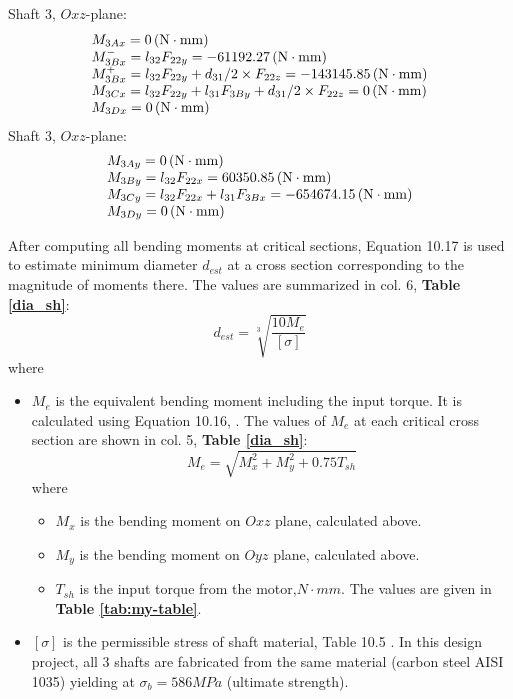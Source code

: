 Shaft 3, $ Oxz $-plane:
\[
\begin{array}{l}
M_{3Ax} = 0 \, (\mathrm{N\cdot mm})\\
M_{3Bx}^- = l_{32}F_{22y} = -61192.27 \, (\mathrm{N\cdot mm})\\
M_{3Bx}^+ = l_{32}F_{22y}+d_{31}/2\times F_{22z} = -143145.85 \, (\mathrm{N\cdot mm})\\
M_{3Cx} = l_{32}F_{22y}+l_{31}F_{3By}+d_{31}/2\times F_{22z} = 0 \, (\mathrm{N\cdot mm})\\
M_{3Dx} = 0 \, (\mathrm{N\cdot mm})\\
\end{array}
\]
Shaft 3, $ Oxz $-plane:
\[
\begin{array}{l}
M_{3Ay} = 0 \, (\mathrm{N\cdot mm})\\
M_{3By} = l_{32}F_{22x} = 60350.85 \, (\mathrm{N\cdot mm})\\
M_{3Cy} = l_{32}F_{22x}+l_{31}F_{3Bx} = -654674.15 \, (\mathrm{N\cdot mm})\\
M_{3Dy} = 0 \, (\mathrm{N\cdot mm})
\end{array}
\]

After computing all bending moments at critical sections, Equation 10.17 \cite{tk1} is used to estimate minimum diameter $ d_{est} $ at a cross section corresponding to the magnitude of moments there. The values are summarized in col. 6, \textbf{Table \ref{dia_sh}}:
\[
d_{est} = \sqrt[3]{\dfrac{10M_e}{[\sigma]}}
\]
where
\begin{itemize}
	\item $ M_e $ is the equivalent bending moment including the input torque. It is calculated using Equation 10.16, \cite{tk1}. The values of $ M_e $ at each critical cross section are shown in col. 5, \textbf{Table \ref{dia_sh}}:
	\[
	M_e = \sqrt{M_x^2 + M_y^2 + 0.75T_{sh}}
	\]
	where
	\begin{itemize}
		\item $ M_x $ is the bending moment on $ Oxz $ plane, calculated above.
		\item $ M_y $ is the bending moment on $ Oyz $ plane, calculated above.
		\item $ T_{sh} $ is the input torque from the motor,$ \unit{N\cdot mm} $. The values are given in \textbf{Table \ref{tab:my-table}}.
	\end{itemize}
	\item $ [\sigma] $ is the permissible stress of shaft material, Table 10.5 \cite{tk1}. In this design project, all 3 shafts are fabricated from the same material (carbon steel AISI 1035) yielding at $ \sigma_b = 586\unit{MPa} $ (ultimate strength).
\end{itemize}

